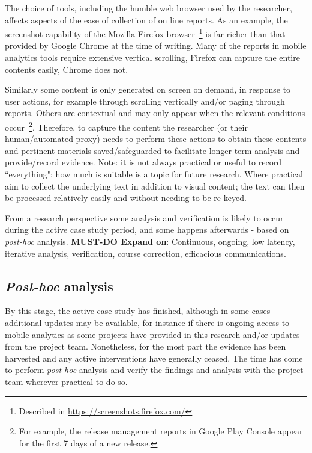 The choice of tools, including the humble web browser used by the researcher, affects aspects of the ease of collection of on line reports. As an example, the screenshot capability of the Mozilla Firefox browser~\footnote{Described in \url{https://screenshots.firefox.com/}} is far richer than that provided by Google Chrome at the time of writing. Many of the reports in mobile analytics tools require extensive vertical scrolling, Firefox can capture the entire contents easily, Chrome does not. 

Similarly some content is only generated on screen on demand, in response to user actions, for example through scrolling vertically and/or paging through reports. Others are contextual and may only appear when the relevant conditions occur~\footnote{For example, the release management reports in Google Play Console appear for the first 7 days of a new release.}. Therefore, to capture the content the researcher (or their human/automated proxy) needs to perform these actions to obtain these contents and pertinent materials saved/safeguarded to facilitate longer term analysis and provide/record evidence. Note: it is not always practical or useful to record ``everything"; how much is suitable is a topic for future research. Where practical aim to collect the underlying text in addition to visual content; the text can then be processed relatively easily and without needing to be re-keyed.




From a research perspective some analysis and verification is likely to occur during the active case study period, and some happens afterwards - based on \emph{post-hoc} analysis. \textbf{MUST-DO Expand on}: Continuous, ongoing, low latency, iterative analysis, verification, course correction, efficacious communications. 

\subsection{\emph{Post-hoc} analysis}
By this stage, the active case study has finished, although in some cases additional updates may be available, for instance if there is ongoing access to mobile analytics as some projects have provided in this research and/or updates from the project team. Nonetheless, for the most part the evidence has been harvested and any active interventions have generally ceased. The time has come to perform \emph{post-hoc} analysis and verify the findings and analysis with the project team wherever practical to do so. 

